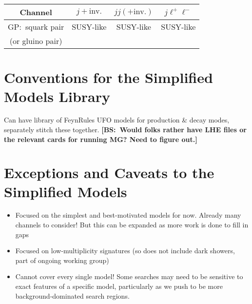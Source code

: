 \begin{center}
\begin{tabular}{ |c|c|c|c|} 
 \hline
Channel & $j+\mathrm{inv.}$ &  $jj(+\mathrm{inv.})$ & $j\ell^+\ell^-$ \\
\hline\hline
GP:~squark pair & SUSY-like & SUSY-like & SUSY-like \\
(or gluino pair) & & &\\
\hline
\end{tabular}
\end{center}

\section{Conventions for the Simplified Models Library}
Can have library of FeynRules UFO models for production \& decay modes, separately stitch these together. {\bf [BS:~Would folks rather have LHE files or the relevant cards for running MG? Need to figure out.]}

\section{Exceptions and Caveats to the Simplified Models} \label{sec:exceptions}
\begin{itemize}
\item Focused on the simplest and best-motivated models for now. Already many channels to consider! But this can be expanded as more work is done to fill in gaps
\item Focused on low-multiplicity signatures (so does not include dark showers, part of ongoing working group)
\item Cannot cover every single model! Some searches may need to be sensitive to exact features of a specific model, particularly as we push to be more background-dominated search regions.
\end{itemize}
